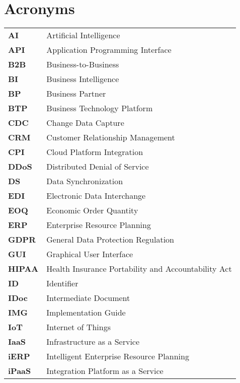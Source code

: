 
\chapter*{Acronyms}


\raggedright
\begin{longtable}{ll}
    \textbf{AI} & Artificial Intelligence \\
    \textbf{API} & Application Programming Interface \\
    \textbf{B2B} & Business-to-Business \\
    \textbf{BI} & Business Intelligence \\
    \textbf{BP} & Business Partner \\
    \textbf{BTP} & Business Technology Platform \\
    \textbf{CDC} & Change Data Capture \\
    \textbf{CRM} & Customer Relationship Management \\
    \textbf{CPI} & Cloud Platform Integration \\
    \textbf{DDoS} & Distributed Denial of Service \\
    \textbf{DS} & Data Synchronization \\
    \textbf{EDI} & Electronic Data Interchange \\
    \textbf{EOQ} & Economic Order Quantity \\
    \textbf{ERP} & Enterprise Resource Planning \\
    \textbf{GDPR} & General Data Protection Regulation \\
    \textbf{GUI} & Graphical User Interface \\
    \textbf{HIPAA} & Health Insurance Portability and Accountability Act \\
    \textbf{ID} & Identifier \\
    \textbf{IDoc} & Intermediate Document \\
    \textbf{IMG} & Implementation Guide \\
    \textbf{IoT} & Internet of Things \\
    \textbf{IaaS} & Infrastructure as a Service \\
    \textbf{iERP} & Intelligent Enterprise Resource Planning \\
    \textbf{iPaaS} & Integration Platform as a Service \\

\end{longtable}
